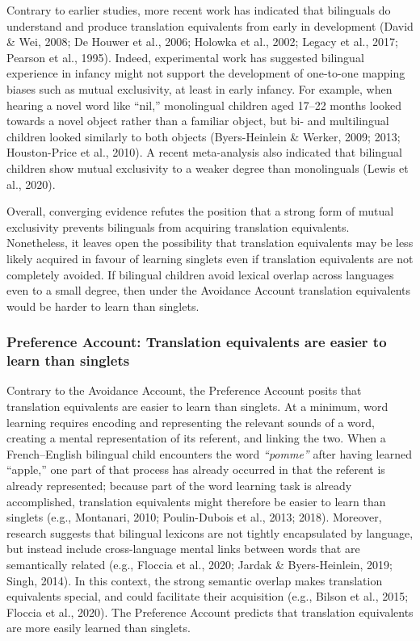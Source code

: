 \documentclass[
  english,
  ,man,floatsintext]{apa6}
\begin{document}
Contrary to earlier studies, more recent work has indicated that bilinguals do understand and produce translation equivalents from early in development (David \& Wei, 2008; De Houwer et al., 2006; Holowka et al., 2002; Legacy et al., 2017; Pearson et al., 1995). Indeed, experimental work has suggested bilingual experience in infancy might not support the development of one-to-one mapping biases such as mutual exclusivity, at least in early infancy. For example, when hearing a novel word like ``nil,'' monolingual children aged 17--22 months looked towards a novel object rather than a familiar object, but bi- and multilingual children looked similarly to both objects (Byers-Heinlein \& Werker, 2009; 2013; Houston-Price et al., 2010). A recent meta-analysis also indicated that bilingual children show mutual exclusivity to a weaker degree than monolinguals (Lewis et al., 2020).

Overall, converging evidence refutes the position that a strong form of mutual exclusivity prevents bilinguals from acquiring translation equivalents. Nonetheless, it leaves open the possibility that translation equivalents may be less likely acquired in favour of learning singlets even if translation equivalents are not completely avoided. If bilingual children avoid lexical overlap across languages even to a small degree, then under the Avoidance Account translation equivalents would be harder to learn than singlets.

\hypertarget{preference-account-translation-equivalents-are-easier-to-learn-than-singlets}{%
\subsubsection{Preference Account: Translation equivalents are easier to learn than singlets}\label{preference-account-translation-equivalents-are-easier-to-learn-than-singlets}}

Contrary to the Avoidance Account, the Preference Account posits that translation equivalents are easier to learn than singlets. At a minimum, word learning requires encoding and representing the relevant sounds of a word, creating a mental representation of its referent, and linking the two. When a French--English bilingual child encounters the word \emph{``pomme''} after having learned ``apple,'' one part of that process has already occurred in that the referent is already represented; because part of the word learning task is already accomplished, translation equivalents might therefore be easier to learn than singlets (e.g., Montanari, 2010; Poulin-Dubois et al., 2013; 2018). Moreover, research suggests that bilingual lexicons are not tightly encapsulated by language, but instead include cross-language mental links between words that are semantically related (e.g., Floccia et al., 2020; Jardak \& Byers-Heinlein, 2019; Singh, 2014). In this context, the strong semantic overlap makes translation equivalents special, and could facilitate their acquisition (e.g., Bilson et al., 2015; Floccia et al., 2020). The Preference Account predicts that translation equivalents are more easily learned than singlets.
\end{document}
